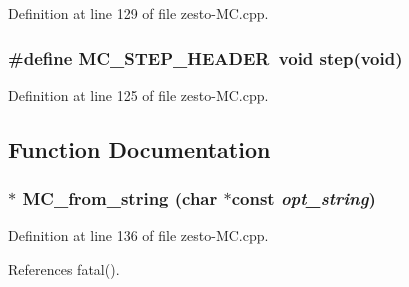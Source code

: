 Definition at line 129 of file zesto-MC.cpp.
\subsubsection[{MC\_\-STEP\_\-HEADER}]{\setlength{\rightskip}{0pt plus 5cm}\#define MC\_\-STEP\_\-HEADER~void step(void)}\label{zesto-MC_8cpp_10ada691d43dea473d88b087727e53f5}




Definition at line 125 of file zesto-MC.cpp.

\subsection{Function Documentation}
\subsubsection[{MC\_\-from\_\-string}]{$\ast$ MC\_\-from\_\-string (char $\ast$const  {\em opt\_\-string})}\label{zesto-MC_8cpp_3315f7f39183ca89969f662f65e2016c}




Definition at line 136 of file zesto-MC.cpp.

References fatal().